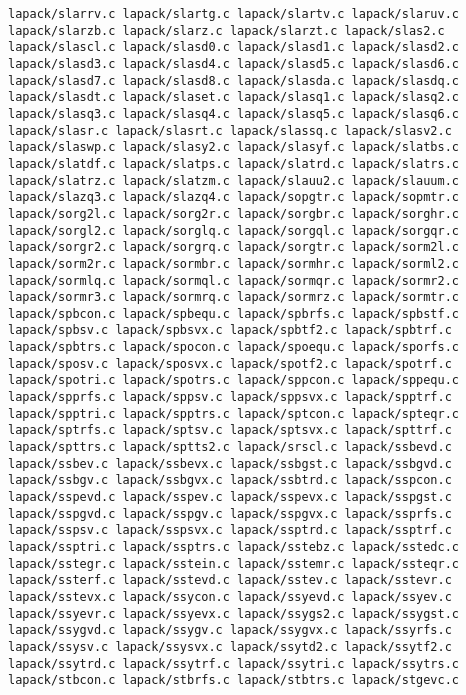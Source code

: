 \documentclass[10pt,a4paper]{article}
\begin{document}
\begin{codeparchment}
\begin{lstlisting}
lapack/slarrv.c lapack/slartg.c lapack/slartv.c lapack/slaruv.c 
lapack/slarzb.c lapack/slarz.c lapack/slarzt.c lapack/slas2.c 
lapack/slascl.c lapack/slasd0.c lapack/slasd1.c lapack/slasd2.c 
lapack/slasd3.c lapack/slasd4.c lapack/slasd5.c lapack/slasd6.c 
lapack/slasd7.c lapack/slasd8.c lapack/slasda.c lapack/slasdq.c 
lapack/slasdt.c lapack/slaset.c lapack/slasq1.c lapack/slasq2.c 
lapack/slasq3.c lapack/slasq4.c lapack/slasq5.c lapack/slasq6.c 
lapack/slasr.c lapack/slasrt.c lapack/slassq.c lapack/slasv2.c 
lapack/slaswp.c lapack/slasy2.c lapack/slasyf.c lapack/slatbs.c 
lapack/slatdf.c lapack/slatps.c lapack/slatrd.c lapack/slatrs.c 
lapack/slatrz.c lapack/slatzm.c lapack/slauu2.c lapack/slauum.c 
lapack/slazq3.c lapack/slazq4.c lapack/sopgtr.c lapack/sopmtr.c 
lapack/sorg2l.c lapack/sorg2r.c lapack/sorgbr.c lapack/sorghr.c 
lapack/sorgl2.c lapack/sorglq.c lapack/sorgql.c lapack/sorgqr.c 
lapack/sorgr2.c lapack/sorgrq.c lapack/sorgtr.c lapack/sorm2l.c 
lapack/sorm2r.c lapack/sormbr.c lapack/sormhr.c lapack/sorml2.c 
lapack/sormlq.c lapack/sormql.c lapack/sormqr.c lapack/sormr2.c 
lapack/sormr3.c lapack/sormrq.c lapack/sormrz.c lapack/sormtr.c 
lapack/spbcon.c lapack/spbequ.c lapack/spbrfs.c lapack/spbstf.c 
lapack/spbsv.c lapack/spbsvx.c lapack/spbtf2.c lapack/spbtrf.c 
lapack/spbtrs.c lapack/spocon.c lapack/spoequ.c lapack/sporfs.c 
lapack/sposv.c lapack/sposvx.c lapack/spotf2.c lapack/spotrf.c 
lapack/spotri.c lapack/spotrs.c lapack/sppcon.c lapack/sppequ.c 
lapack/spprfs.c lapack/sppsv.c lapack/sppsvx.c lapack/spptrf.c 
lapack/spptri.c lapack/spptrs.c lapack/sptcon.c lapack/spteqr.c 
lapack/sptrfs.c lapack/sptsv.c lapack/sptsvx.c lapack/spttrf.c 
lapack/spttrs.c lapack/sptts2.c lapack/srscl.c lapack/ssbevd.c 
lapack/ssbev.c lapack/ssbevx.c lapack/ssbgst.c lapack/ssbgvd.c 
lapack/ssbgv.c lapack/ssbgvx.c lapack/ssbtrd.c lapack/sspcon.c 
lapack/sspevd.c lapack/sspev.c lapack/sspevx.c lapack/sspgst.c 
lapack/sspgvd.c lapack/sspgv.c lapack/sspgvx.c lapack/ssprfs.c 
lapack/sspsv.c lapack/sspsvx.c lapack/ssptrd.c lapack/ssptrf.c 
lapack/ssptri.c lapack/ssptrs.c lapack/sstebz.c lapack/sstedc.c 
lapack/sstegr.c lapack/sstein.c lapack/sstemr.c lapack/ssteqr.c 
lapack/ssterf.c lapack/sstevd.c lapack/sstev.c lapack/sstevr.c 
lapack/sstevx.c lapack/ssycon.c lapack/ssyevd.c lapack/ssyev.c 
lapack/ssyevr.c lapack/ssyevx.c lapack/ssygs2.c lapack/ssygst.c 
lapack/ssygvd.c lapack/ssygv.c lapack/ssygvx.c lapack/ssyrfs.c 
lapack/ssysv.c lapack/ssysvx.c lapack/ssytd2.c lapack/ssytf2.c 
lapack/ssytrd.c lapack/ssytrf.c lapack/ssytri.c lapack/ssytrs.c 
lapack/stbcon.c lapack/stbrfs.c lapack/stbtrs.c lapack/stgevc.c 

\end{lstlisting}
\end{codeparchment}
\end{document}
